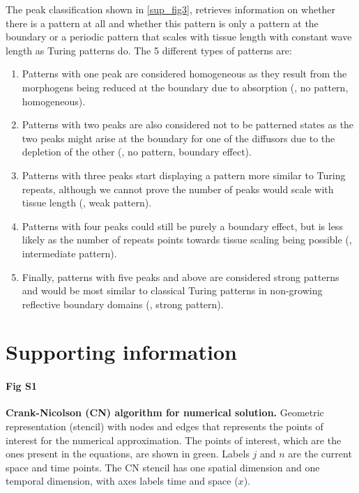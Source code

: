 \documentclass[10pt,letterpaper]{article}
\begin{document}
The peak classification shown in \ref{sup_fig3}, retrieves information on whether there is a pattern at all and whether this pattern is only a pattern at the boundary or a periodic pattern that scales with tissue length with constant wave length as Turing patterns do.
The 5 different types of patterns are:
\begin{enumerate}
    \item Patterns with one peak are considered homogeneous as they result from the morphogens being reduced at the boundary due to absorption (, no pattern, homogeneous).
    \item Patterns with two peaks are also considered not to be patterned states as the two peaks might arise at the boundary for one of the diffusors due to the depletion of the other (, no pattern, boundary effect).
    \item Patterns with three peaks start displaying a pattern more similar to Turing repeats, although we cannot prove the number of peaks would scale with tissue length  (, weak pattern).
    \item Patterns with four peaks could still be purely a boundary effect, but is less likely as the number of repeats points towards tissue scaling being possible (, intermediate pattern).
    \item Finally, patterns with five peaks and above are considered strong patterns and would be most similar to classical Turing patterns in non-growing reflective boundary domains (, strong pattern).
\end{enumerate}





\section*{Supporting information}
%
\paragraph*{Fig S1}
\label{S1_Fig}
{\bf Crank-Nicolson (CN) algorithm for numerical solution.}  Geometric representation (stencil) with nodes and edges that represents the points of interest for the numerical approximation. The points of interest, which are the ones present in the equations, are shown in green. Labels $j$ and $n$ are the current space and time points. The CN stencil has one spatial dimension and one temporal dimension, with axes labels time and space ($x$).
\end{document}
